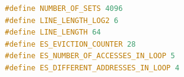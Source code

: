 \begin{lstlisting}[language=c,caption=Parameter definitions for eviction set configuration, label=lst:default]
#define NUMBER_OF_SETS 4096
#define LINE_LENGTH_LOG2 6
#define LINE_LENGTH 64
#define ES_EVICTION_COUNTER 28
#define ES_NUMBER_OF_ACCESSES_IN_LOOP 5
#define ES_DIFFERENT_ADDRESSES_IN_LOOP 4
\end{lstlisting}
